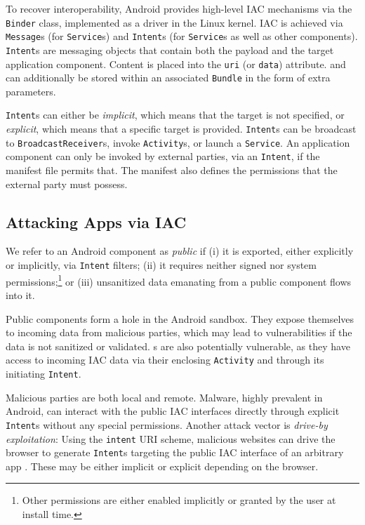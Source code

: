 To recover interoperability, Android provides high-level IAC mechanisms via the {\tt Binder} class, implemented as a driver in the Linux kernel. IAC is achieved via {\tt Message}s (for {\tt Service}s) and {\tt Intent}s (for {\tt Service}s as well as other components). {\tt Intent}s are messaging objects that contain both the payload and the target application component. Content is placed into the {\tt uri} (or {\tt data}) attribute. and can additionally be stored within an associated {\tt Bundle} in the form of extra parameters. 

{\tt Intent}s can either be \emph{implicit}, which means that the target is not specified, or \emph{explicit}, which means that a specific target is provided. 
%
{\tt Intent}s can be broadcast
to {\tt BroadcastReceiver}s, invoke {\tt Activity}s, or launch
a {\tt Service}. An application component can only be invoked by external parties, via an {\tt Intent}, if the manifest file permits that. The manifest also defines the permissions that the external party must possess.

\subsection{Attacking Apps via IAC}

We refer to an Android component as \emph{public} if (i) it is exported, either explicitly or implicitly, via {\tt Intent} filters; (ii) it requires neither signed nor system permissions;\footnote{
	Other permissions are either enabled implicitly or granted by the user at install time.
} or (iii) unsanitized data emanating from a public component flows into it.

Public components form a hole in the Android sandbox. They expose themselves to incoming data from malicious parties, which may lead to vulnerabilities if the data is not sanitized or validated. {\Frag}s are also potentially vulnerable, as they have access to incoming IAC data via their enclosing {\tt Activity} and through its initiating {\tt Intent}.

Malicious parties are both local and remote. Malware, highly prevalent in Android, can interact with the public IAC interfaces directly through explicit {\tt Intent}s without any special permissions. Another attack vector is \emph{drive-by exploitation}: Using the {\tt intent} URI scheme, malicious websites can drive the browser to generate {\tt Intent}s targeting the public IAC interface of an arbitrary app \cite{PHAB:ACSAC10,E:driveby,T:driveby}. These may be either implicit or explicit depending on the browser.

